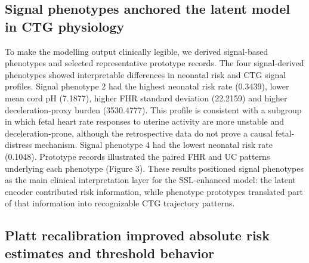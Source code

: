 \documentclass[utf8]{FrontiersinHarvard}
\begin{document}
\subsection{Signal phenotypes anchored the latent model in CTG physiology}

To make the modelling output clinically legible, we derived signal-based phenotypes and selected representative prototype records. The four signal-derived phenotypes showed interpretable differences in neonatal risk and CTG signal profiles. Signal phenotype 2 had the highest neonatal risk rate (0.3439), lower mean cord pH (7.1877), higher FHR standard deviation (22.2159) and higher deceleration-proxy burden (3530.4777). This profile is consistent with a subgroup in which fetal heart rate responses to uterine activity are more unstable and deceleration-prone, although the retrospective data do not prove a causal fetal-distress mechanism. Signal phenotype 4 had the lowest neonatal risk rate (0.1048). Prototype records illustrated the paired FHR and UC patterns underlying each phenotype (Figure 3).
 These results positioned signal phenotypes as the main clinical interpretation layer for the SSL-enhanced model: the latent encoder contributed risk information, while phenotype prototypes translated part of that information into recognizable CTG trajectory patterns.

\subsection{Platt recalibration improved absolute risk estimates and threshold behavior}
\end{document}

